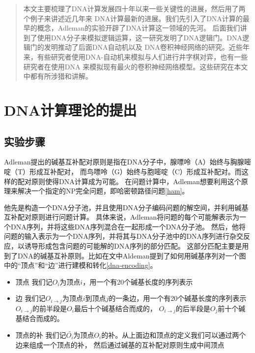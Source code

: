 \documentclass[a4paper,twoside]{article}
\begin{document}
\newpage

\begin{abstract}
	本文主要梳理了DNA计算发展四十年以来一些关键性的进展，然后用了两个例子来讲述近几年来
	DNA计算最新的进展。我们先引入了DNA计算的最早的概念，Adleman的实验开辟了DNA计算这一领域的先河。
	后面我们讲到了使用DNA分子来模拟逻辑运算，这一研究发明了DNA逻辑门。DNA逻辑门的发明推动了后面DNA自动机以及
	DNA卷积神经网络的研究。近些年来，有些研究者使用DNA-自动机来模拟与人们进行井字棋对弈，也有一些研究者在使用DNA
	来模拟现有最火的卷积神经网络模型。这些研究在本文中都有所涉猎和讲解。


\end{abstract}
\newpage

\tableofcontents
\newpage


\section{DNA计算理论的提出}
\subsection{实验步骤}
Adleman\cite{ref1}提出的碱基互补配对原则是指在DNA分子中，腺嘌呤（A）始终与胸腺嘧啶（T）形成互补配对，
而鸟嘌呤（G）始终与胞嘧啶（C）形成互补配对。而这样的配对原则使得DNA计算成为可能。
在问题计算中，Adleman想要利用这个原理来解决一个指定的NP完全问题，即哈密顿路径问题\ref{ham}。

他先是构造一个DNA分子池，并且使用DNA分子编码问题的解空间，并利用碱基互补配对原则进行问题计算。
具体来说，Adleman将问题的每个可能解表示为一个DNA序列，并将这些DNA序列混合在一起形成一个DNA分子池。
然后，他将问题的输入表示为一个DNA序列，并将其与DNA分子池中的DNA序列进行杂交反应，以诱导形成包含问题的可能解的DNA序列的部分匹配。
这部分匹配主要是用到了DNA的碱基互补原则。比如在文中Aldeman提到了如何用碱基序列对一个图中的“顶点”和“边”进行建模和转化\ref{dna-encoding}。
\begin{itemize}
	\item 顶点 \quad
	      我们记$O_i$为顶点$i$，用一个有20个碱基长度的序列表示
	\item 边 \quad
	      我们记$O_{i \rightarrow j}$为顶点$i$到顶点$j$的一条边，用一个有20个碱基长度的序列表示
	      $O_{i \rightarrow j}$的前半段是$O_i$最后十个碱基结合而成的，
	      $O_{i \rightarrow j}$的后半段是$O_j$前十个碱基结合而成的。
	\item 顶点的补
	      我们记$\bar{O_i}$为顶点$O_i$的补。从上面边和顶点的定义我们可以通过两个边来组成一个顶点的补，
	      然后通过碱基的互补配对原则生成中间顶点
\end{itemize}
\end{document}
